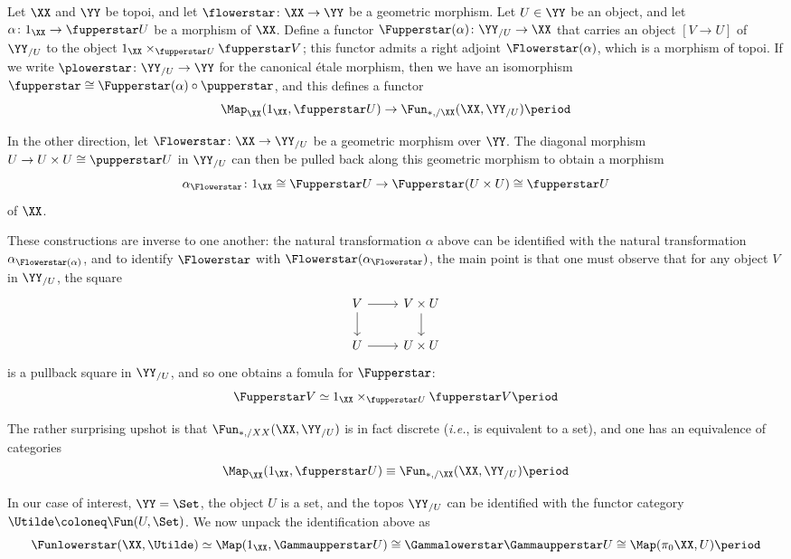 \begin{cnstr}
	Let $ \XX $ and $ \YY $ be topoi, and let $ \flowerstar \colon \XX \to \YY $ be a geometric morphism.
	Let $ U \in \YY $ be an object, and let $ \alpha \colon 1_{\XX} \to \fupperstar U $ be a morphism of $ \XX $.
	Define a functor $ \Fupperstar(\alpha) \colon \YY_{/U} \to \XX $ that carries an object $ [ V \to U ] $ of $ \YY_{/U} $ to the object $ 1_{\XX} \times_{\fupperstar U} \fupperstar V $;
	this functor admits a right adjoint $ \Flowerstar(\alpha) $, which is a morphism of topoi.
	If we write $ \plowerstar \colon \YY_{/U} \to \YY $ for the canonical étale morphism, then we have an isomorphism $ \fupperstar \cong \Fupperstar(\alpha) \circ \pupperstar $, and
	this defines a functor
	\[
		\Map_{\XX}(1_{\XX}, \fupperstar U) \to \Fun_{\ast,/\XX}(\XX, \YY_{/U}) \period
	\]

	In the other direction, let $ \Flowerstar \colon \XX \to \YY_{/U} $ be a geometric morphism over $ \YY $.
	The diagonal morphism $ U \to U \times U \cong \pupperstar U $ in $ \YY_{/U} $ can then be pulled back along this geometric morphism to obtain a morphism
	\[
		\alpha_{\Flowerstar} \colon 1_{\XX} \cong \Fupperstar U \to \Fupperstar(U \times U) \cong \fupperstar U
	\]
	of $ \XX $.

	These constructions are inverse to one another: the natural transformation $ \alpha $ above can be identified with the natural transformation $ \alpha_{\Flowerstar(\alpha)} $, and
	to identify $ \Flowerstar $ with $ \Flowerstar(\alpha_{\Flowerstar}) $, the main point is that one must observe that for any object $ V $ in $ \YY_{/U} $, the square
	\begin{equation*}
		\begin{tikzcd}
			V \ar[d] \ar[r] & V \times U \ar[d] \\
			U \ar[r] & U \times U
		\end{tikzcd}
	\end{equation*}
	is a pullback square in $ \YY_{/U} $, and so one obtains a fomula for $ \Fupperstar $:
	\[
		\Fupperstar V \simeq 1_{\XX} \times_{\fupperstar U} \fupperstar V \period
	\]

	The rather surprising upshot is that $ \Fun_{\ast,/XX}(\XX, \YY_{/U}) $ is in fact discrete (\emph{i.e.}, is equivalent to a set), and one has an equivalence of categories
	\[
		\Map_{\XX}(1_{\XX}, \fupperstar U) \equiv \Fun_{\ast,/\XX}(\XX, \YY_{/U}) \period
	\]
\end{cnstr}

\begin{nul}
	In our case of interest, $ \YY = \Set $, the object $ U $ is a set, and the topos $ \YY_{/U} $ can be identified with the functor category $ \Utilde \coloneq \Fun(U, \Set) $.
	We now unpack the identification above as
	\[
		\Funlowerstar(\XX, \Utilde) \simeq \Map(1_{\XX}, \Gammaupperstar U) \cong \Gammalowerstar\Gammaupperstar U \cong \Map(\pi_0\XX, U) \period
	\]
\end{nul}

